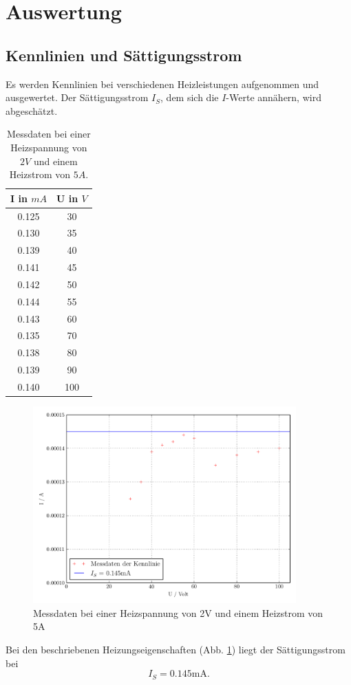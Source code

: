 \clearpage

\section{Auswertung}
\label{sec:Auswertung}


\subsection{Kennlinien und Sättigungsstrom}
\label{subsec:kennlinien}
Es werden Kennlinien bei verschiedenen Heizleistungen aufgenommen und ausgewertet. Der Sättigungsstrom $I_S$, dem sich die $I$-Werte annähern, wird abgeschätzt.

\begin{table}
 \centering
 \caption{Messdaten bei einer Heizspannung von $2V$ und einem Heizstrom von $5A$.}
 \label{tab:daten1}
 \begin{tabular}{|c c|}  
 \toprule
I in $mA$ & U in $V$\\
\midrule
0.125 & 30\\
0.130 & 35\\
0.139 & 40\\
0.141 & 45\\
0.142 & 50\\
0.144 & 55\\
0.143 & 60\\
0.135 & 70\\
0.138 & 80\\
0.139 & 90\\
0.140 & 100\\
\bottomrule
\end{tabular}
\end{table}


\begin{figure}[H]
  \centering
  \includegraphics[width=0.9\textwidth]{build/Kennlinie1.pdf}
  \caption{Messdaten bei einer Heizspannung von 2V und einem Heizstrom von 5A \cite{sample}}
  \label{fig:kenn1}
\end{figure}
Bei den beschriebenen Heizungseigenschaften (Abb. \ref{fig:kenn1}) liegt der Sättigungsstrom bei 
\begin{equation}
I_S = 0.145 \mathrm{mA}.
\label{eq:kenn1ergebnis}
\end{equation}

